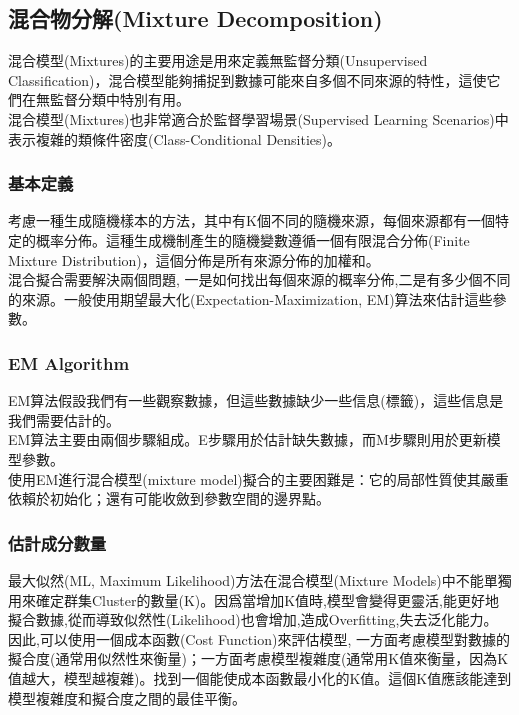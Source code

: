 \documentclass[10pt, a4paper]{article}
\begin{document}
\begin{CJK*}{UTF8}{bsmi}
\subsection{混合物分解(Mixture Decomposition)}
混合模型(Mixtures)的主要用途是用來定義無監督分類(Unsupervised Classification)，混合模型能夠捕捉到數據可能來自多個不同來源的特性，這使它們在無監督分類中特別有用。\\[0.5em]
混合模型(Mixtures)也非常適合於監督學習場景(Supervised Learning Scenarios)中表示複雜的類條件密度(Class-Conditional Densities)。
\subsubsection{基本定義}
考慮一種生成隨機樣本的方法，其中有K個不同的隨機來源，每個來源都有一個特定的概率分佈。這種生成機制產生的隨機變數遵循一個有限混合分佈(Finite Mixture Distribution)，這個分佈是所有來源分佈的加權和。\\[0.5em]
混合擬合需要解決兩個問題, 一是如何找出每個來源的概率分佈,二是有多少個不同的來源。一般使用期望最大化(Expectation-Maximization, EM)算法來估計這些參數。
\subsubsection{EM Algorithm}
EM算法假設我們有一些觀察數據，但這些數據缺少一些信息(標籤)，這些信息是我們需要估計的。\\[0.5em]
EM算法主要由兩個步驟組成。E步驟用於估計缺失數據，而M步驟則用於更新模型參數。\\[0.5em]
使用EM進行混合模型(mixture model)擬合的主要困難是：它的局部性質使其嚴重依賴於初始化；還有可能收斂到參數空間的邊界點。
\subsubsection{估計成分數量}
最大似然(ML, Maximum Likelihood)方法在混合模型(Mixture Models)中不能單獨用來確定群集Cluster的數量(K)。因爲當增加K值時,模型會變得更靈活,能更好地擬合數據,從而導致似然性(Likelihood)也會增加,造成Overfitting,失去泛化能力。\\[0.5em]
因此,可以使用一個成本函數(Cost Function)來評估模型, 一方面考慮模型對數據的擬合度(通常用似然性來衡量)；一方面考慮模型複雜度(通常用K值來衡量，因為K值越大，模型越複雜)。找到一個能使成本函數最小化的K值。這個K值應該能達到模型複雜度和擬合度之間的最佳平衡。


\end{CJK*}
\end{document}
